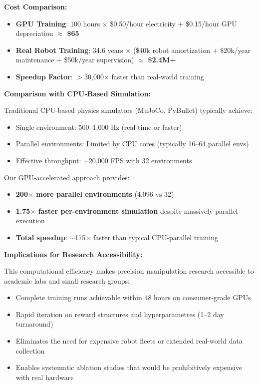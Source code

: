\documentclass[12pt,a4paper,oneside]{report}
\begin{document}
\textbf{Cost Comparison:}
\begin{itemize}
    \item \textbf{GPU Training}: 100 hours $\times$ \$0.50/hour electricity + \$0.15/hour GPU depreciation $\approx$ \textbf{\$65}
    \item \textbf{Real Robot Training}: 34.6 years $\times$ (\$40k robot amortization + \$20k/year maintenance + \$50k/year supervision) $\approx$ \textbf{\$2.4M+}
    \item \textbf{Speedup Factor}: $>$30{,}000$\times$ faster than real-world training
\end{itemize}

\textbf{Comparison with CPU-Based Simulation:}

Traditional CPU-based physics simulators (MuJoCo, PyBullet) typically achieve:
\begin{itemize}
    \item Single environment: 500--1{,}000 Hz (real-time or faster)
    \item Parallel environments: Limited by CPU cores (typically 16--64 parallel envs)
    \item Effective throughput: $\sim$20{,}000 FPS with 32 environments
\end{itemize}

Our GPU-accelerated approach provides:
\begin{itemize}
    \item \textbf{200$\times$ more parallel environments} (4{,}096 vs 32)
    \item \textbf{1.75$\times$ faster per-environment simulation} despite massively parallel execution
    \item \textbf{Total speedup}: $\sim$175$\times$ faster than typical CPU-parallel training
\end{itemize}

\textbf{Implications for Research Accessibility:}

This computational efficiency makes precision manipulation research accessible to academic labs and small research groups:
\begin{itemize}
    \item Complete training runs achievable within 48 hours on consumer-grade GPUs
    \item Rapid iteration on reward structures and hyperparametres (1--2 day turnaround)
    \item Eliminates the need for expensive robot fleets or extended real-world data collection
    \item Enables systematic ablation studies that would be prohibitively expensive with real hardware
\end{itemize}
\end{document}
